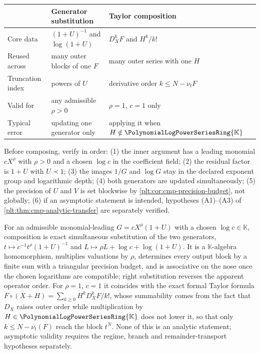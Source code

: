 \documentclass[11pt,oneside]{article}
\theoremstyle{plain}
\theoremstyle{definition}
\theoremstyle{remark}
\newcommand{\K}{\mathbb{K}}
\newcommand{\PLpow}{\PolynomialLogPowerSeriesRing{\K}}   %
\newcommand{\ordt}{\nu_{t}}                              %
\newcommand{\DX}{D_{X}}                                  %
\newcommand{\compose}{\mathbin{\circ}}
\newcommand{\precdom}{\prec}
\begin{document}
\begin{center}
\begin{tabular}{@{}lll@{}}
\hline
 & Generator substitution & Taylor composition\\
\hline
Core data & \((1+U)^{-1}\) and \(\log(1+U)\)
          & \(\DX^{k}F\) and \(H^{k}/k!\)\\
Reused across & many outer blocks of one \(F\)
              & many outer series with one \(H\)\\
Truncation index & powers of \(U\)
                 & derivative order \(k\le N-\ordt F\)\\
Valid for & any admissible \(\rho>0\) & \(\rho=1\), \(c=1\) only\\
Typical error & updating one generator only
              & applying it when \(H\notin\PLpow\)\\
\hline
\end{tabular}
\end{center}

\begin{checkpointbox}
Before composing, verify in order: (1) the inner argument has a leading
monomial \(cX^{\rho}\) with \(\rho>0\) and a chosen \(\log c\) in the
coefficient field; (2) the residual factor is \(1+U\) with
\(U\precdom1\); (3) the images \(1/G\) and \(\log G\) stay in the declared
exponent group and logarithmic depth; (4) both generators are updated
simultaneously; (5) the precision of \(U\) and \(V\) is set blockwise by
\cref{plt:cor:cmp-precision-budget}, not globally; (6) if an asymptotic
statement is intended, hypotheses (A1)--(A3) of
\cref{plt:thm:cmp-analytic-transfer} are separately verified.
\end{checkpointbox}

\begin{summarybox}
For an admissible monomial-leading \(G=cX^{\rho}(1+U)\) with a chosen
\(\log c\in\K\), composition is exact simultaneous substitution of the two
generators, \(t\mapsto c^{-1}t^{\rho}(1+U)^{-1}\) and
\(L\mapsto\rho L+\log c+\log(1+U)\).  It is a \(\K\)-algebra homomorphism,
multiplies valuations by \(\rho\), determines every output block by a finite
sum with a triangular precision budget, and is associative on the nose once
the chosen logarithms are compatible; right substitution reverses the apparent
operator order.  For \(\rho=1\), \(c=1\) it coincides with the exact formal
Taylor formula \(F\compose(X+H)=\sum_{k\ge0}H^{k}\DX^{k}F/k!\), whose
summability comes from the fact that \(\DX\) raises outer order while
multiplication by \(H\in\PLpow\) does not lower it, so that only
\(k\le N-\ordt(F)\) reach the block \(t^{N}\).  None of this is an analytic
statement; asymptotic validity requires the regime, branch and
remainder-transport hypotheses separately.
\end{summarybox}
\end{document}
